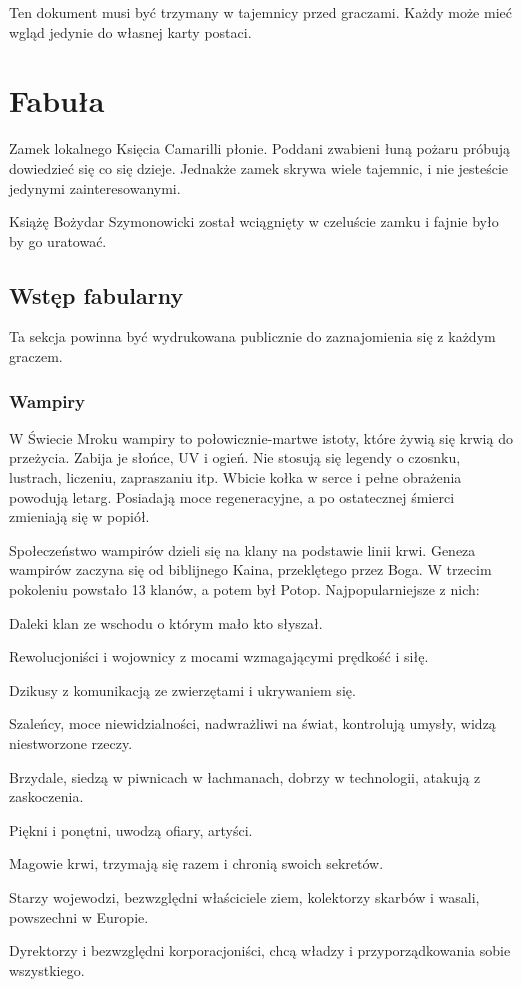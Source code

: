 Ten dokument musi być trzymany w tajemnicy przed graczami.
Każdy może mieć wgląd jedynie do własnej karty postaci.

\section{Fabuła}
	Zamek lokalnego Księcia Camarilli płonie.
	Poddani zwabieni łuną pożaru próbują dowiedzieć się co się dzieje.
	Jednakże zamek skrywa wiele tajemnic, i nie jesteście jedynymi zainteresowanymi.
	
	Książę Bożydar Szymonowicki został wciągnięty w czeluście zamku i fajnie było by go uratować.
	
	\subsection{Wstęp fabularny}
	\label{sec:fabularny}
		Ta sekcja powinna być wydrukowana publicznie do zaznajomienia się z każdym graczem.
		\subsubsection{Wampiry}
			W Świecie Mroku wampiry to połowicznie-martwe istoty, które żywią się krwią do przeżycia.
			Zabija je słońce, UV i ogień. Nie stosują się legendy o czosnku, lustrach, liczeniu, zapraszaniu itp.
			Wbicie kołka w serce i pełne obrażenia powodują letarg.
			Posiadają moce regeneracyjne, a po ostatecznej śmierci zmieniają się w popiół.
			
			Społeczeństwo wampirów dzieli się na klany na podstawie linii krwi.
			Geneza wampirów zaczyna się od biblijnego Kaina, przeklętego przez Boga.
			W trzecim pokoleniu powstało 13 klanów, a potem był Potop. Najpopularniejsze z nich:
			\begin{description}[noitemsep]
				\item[Banu Haquim] Daleki klan ze wschodu o którym mało kto słyszał.
				\item[Brujah] Rewolucjoniści i wojownicy z mocami wzmagającymi prędkość i siłę.
				\item[Gangriel] Dzikusy z komunikacją ze zwierzętami i ukrywaniem się.
				\item[Malkawian] Szaleńcy, moce niewidzialności, nadwrażliwi na świat, kontrolują umysły, widzą niestworzone rzeczy.
				\item[Nosferatu] Brzydale, siedzą w piwnicach w łachmanach, dobrzy w technologii, atakują z zaskoczenia.
				\item[Toreador] Piękni i ponętni, uwodzą ofiary, artyści.
				\item[Tremere] Magowie krwi, trzymają się razem i chronią swoich sekretów.
				\item[Tzimisce] Starzy wojewodzi, bezwzględni właściciele ziem, kolektorzy skarbów i wasali, powszechni w Europie.
				\item[Ventrue] Dyrektorzy i bezwzględni korporacjoniści, chcą władzy i przyporządkowania sobie wszystkiego.
			\end{description}
			
